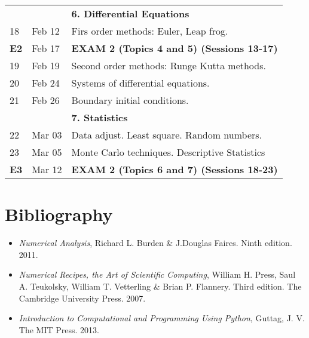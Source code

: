 \documentclass[a4,useAMS,usenatbib,usegraphicx,12pt]{article}
\begin{document}
\begin{table}[!ht]
\begin{small}
\begin{flushleft}
\begin{center}
\begin{tabular}{l  l  l}
	& & \textbf{6. Differential Equations} \\
	18 & Feb 12& Firs order methods: Euler, Leap frog. \\
	\textbf{E2} & Feb 17& \textbf{EXAM 2 (Topics 4 and 5) (Sessions 13-17)} \\
	19 & Feb 19& Second order methods: Runge Kutta methods. \\
	20 & Feb 24& Systems of differential equations.\\
	21 & Feb 26& Boundary initial conditions.\\
	& & \textbf{7. Statistics} \\
	22 & Mar 03&  Data adjust. Least square. Random numbers.\\
	23 & Mar 05&  Monte Carlo techniques. Descriptive Statistics\\
	\textbf{E3} & Mar 12& \textbf{EXAM 2 (Topics 6 and 7) (Sessions 18-23)} \\
	\hline\hline
  \end{tabular}  
\end{center}
\end{flushleft}
\end{small}
\end{table}

\newpage
\section*{Bibliography}
\begin{itemize}
\item \textit{Numerical Analysis}, Richard L. Burden \& J.Douglas Faires. Ninth edition. 2011.
\item \textit{Numerical Recipes, the Art of Scientific Computing}, William H. Press, Saul A. Teukolsky,
William T. Vetterling \& Brian P. Flannery. Third edition. The Cambridge University Press. 2007.
\item \textit{Introduction to Computational and Programming Using Python}, Guttag, J. V. 
The MIT Press. 2013.
\end{itemize}

\end{document}
